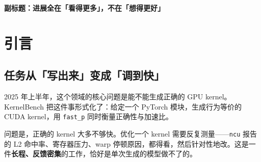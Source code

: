 
\textbf{副标题：进展全在「看得更多」，不在「想得更好」}

\begin{abstract}

2025 年初到 2026 年底，把大模型做成「能自己编译、自己测速、自己改 kernel」的智能体，从一个想法变成了一个至少有 26 个系统的方向。本文检视这 26 个核心工作，要回答一个问题：\textbf{这些系统的能力究竟来自哪里？}

答案不太符合直觉。若把智能体的能力拆成两部分——「推理更强」与「环境信号更多」——本文找到的证据表明，进展几乎全部来自后者。观测通道（编译器报错、NCU 计数器、实测时延）与动作粒度（整文件重写 vs 局部编辑）这两类设计，解释了这个方向绝大部分的技术差异；而更好的规划、更强的推理，在语料里没有形成独立的技术线索。

这个判断带来一个更尖锐的推论。把智能体循环拆成五个环节——观测（observe）、动作（act）、预算（budget）、恢复（recover）、评测（eval）——逐一统计每篇工作覆盖了哪些环节，结果是：\textbf{跨三个及以上环节的工作数为 0}。也就是说，这 26 个系统没有一个在系统层面做设计，它们各自改进一个环节，然后在同一个 benchmark 上比分数。

本文认为这不是巧合，而是评测结构导致的：KernelBench 的 \texttt{fast\_p} 口径为\textbf{单次生成}设计，而智能体可以试几十次只报最好的一次。在「只报最好一次」的评分下，优化最薄的那个环节（多试几次）比设计整个循环更划算。

本文的贡献有三点。第一，给出智能体循环的五维分析框架，并用它逐篇标注 26 个工作。第二，量化指出「系统性缺失」——跨维度工作为 0，而失败恢复是最被忽略的环节（5 篇 vs 预算环节的 9 篇）。第三，指出评测口径与智能体自由度之间的错配，并给出可操作的最小修正：报告尝试次数与总成本。

\end{abstract}
\section{引言}

\subsection{任务从「写出来」变成「调到快」}

2025 年上半年，这个领域的核心问题是能不能生成正确的 GPU kernel。KernelBench 把这件事形式化了：给定一个 PyTorch 模块，生成行为等价的 CUDA kernel，用 \texttt{fast\_p} 同时衡量正确性与加速比。

问题是，正确的 kernel 大多不够快。优化一个 kernel 需要反复测量——\texttt{ncu} 报告的 L2 命中率、寄存器压力、warp 停顿原因，都得看，然后针对性地改。这是一件\textbf{长程、反馈密集}的工作，恰好是单次生成的模型做不了的。

